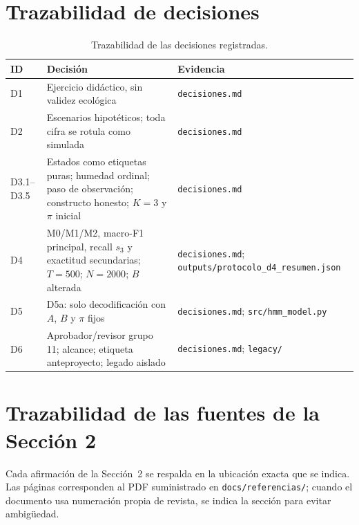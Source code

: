 \documentclass[11pt,a4paper]{article}
\begin{document}
\section{Trazabilidad de decisiones}

\begin{table}[H]
\centering
\caption{Trazabilidad de las decisiones registradas.}
\begin{tabularx}{\textwidth}{@{}l>{\raggedright\arraybackslash}X>{\raggedright\arraybackslash}X@{}}
\toprule
ID & Decisión & Evidencia\\
\midrule
D1 & Ejercicio didáctico, sin validez ecológica & \texttt{decisiones.md}\\
D2 & Escenarios hipotéticos; toda cifra se rotula como simulada & \texttt{decisiones.md}\\
D3.1--D3.5 & Estados como etiquetas puras; humedad ordinal; paso de observación; constructo honesto; \(K=3\) y \(\pi\) inicial & \texttt{decisiones.md}\\
D4 & M0/M1/M2, macro-F1 principal, recall \(s_3\) y exactitud secundarias; \(T=500\); \(N=2000\); \(B\) alterada & \texttt{decisiones.md}; \texttt{outputs/protocolo\_d4\_resumen.json}\\
D5 & D5a: solo decodificación con \(A\), \(B\) y \(\pi\) fijos & \texttt{decisiones.md}; \texttt{src/hmm\_model.py}\\
D6 & Aprobador/revisor grupo 11; alcance; etiqueta anteproyecto; legado aislado & \texttt{decisiones.md}; \texttt{legacy/}\\
\bottomrule
\end{tabularx}
\end{table}

\section{Trazabilidad de las fuentes de la Sección 2}

Cada afirmación de la Sección~2 se respalda en la ubicación exacta que se indica. Las páginas corresponden al PDF suministrado en \texttt{docs/referencias/}; cuando el documento usa numeración propia de revista, se indica la sección para evitar ambigüedad.
\end{document}

